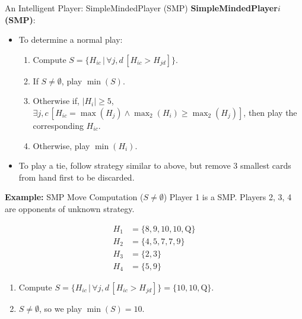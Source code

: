 \documentclass{slides}
\let\geq=\geqslant
\begin{document}
\begin{frame}{An Intelligent Player: SimpleMindedPlayer (SMP)}
    \textbf{SimpleMindedPlayer$i$ (SMP)}:
    \begin{itemize}
        \item To determine a normal play:
            \begin{enumerate}
                \item Compute $S = \{H_{ic} \,|\, \forall j,d\, [H_{ic} >
                    H_{jd}]\}$.
                \item If $S \ne \emptyset$, play $\min(S)$.
                \item Otherwise if, $|H_i| \geq 5$, $\exists j,c \,[H_{ic} =
                    \max\left(H_{j}\right) \land \max_2\left(H_{i}\right) \geq
                    \max_2\left(H_{j}\right)]$, then play the corresponding $H_{ic}$.
                \item Otherwise, play $\min\left(H_{i}\right)$.
            \end{enumerate}
        \item To play a tie, follow strategy similar to above, but remove 3
              smallest cards from hand first to be discarded.
    \end{itemize}

\end{frame}

\begin{frame}{\textbf{Example:} SMP Move Computation ($S \ne \emptyset$)}
    Player 1 is a SMP. Players 2, 3, 4 are opponents of unknown strategy.

    \pause

    \begin{align*}
        H_1 &= \{8, 9, 10, 10, \mathrm{Q}\} \\
        H_2 &= \{4, 5, 7, 7, 9\} \\
        H_3 &= \{2, 3\} \\
        H_4 &= \{5, 9\}
    \end{align*}

    \pause

    \begin{enumerate}[<+->]
        \item Compute $S = \{H_{ic} \,|\, \forall j,d\, [H_{ic} >
            H_{jd}]\} = \{10, 10, \mathrm{Q}\}$.
        \item $S \ne \emptyset$, so we play $\min(S) = 10$.
    \end{enumerate}

\end{frame}
\end{document}
